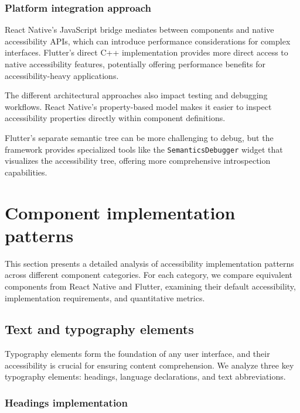 \pagebreak

\subsubsection{Platform integration approach}
React Native's JavaScript bridge mediates between components and native accessibility APIs, which can introduce performance considerations for complex interfaces. Flutter's direct C++ implementation provides more direct access to native accessibility features, potentially offering performance benefits for accessibility-heavy applications.

The different architectural approaches also impact testing and debugging workflows. React Native's property-based model makes it easier to inspect accessibility properties directly within component definitions.

Flutter's separate semantic tree can be more challenging to debug, but the framework provides specialized tools like the \texttt{SemanticsDebugger} widget that visualizes the accessibility tree, offering more comprehensive introspection capabilities.

\section{Component implementation patterns}
\label{sec:component-patterns}

This section presents a detailed analysis of accessibility implementation patterns across different component categories. For each category, we compare equivalent components from React Native and Flutter, examining their default accessibility, implementation requirements, and quantitative metrics.

\subsection{Text and typography elements}
\label{subsec:text-typography}

Typography elements form the foundation of any user interface, and their accessibility is crucial for ensuring content comprehension. We analyze three key typography elements: headings, language declarations, and text abbreviations.

\subsubsection{Headings implementation}
\label{subsubsec:headings-implementation}

